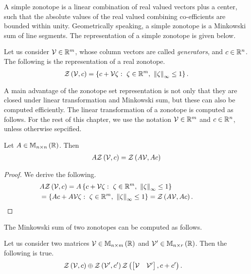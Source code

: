 A simple zonotope is a linear combination of real valued vectors plus a
center, such that the absolute values of the real valued combining
co-efficients are bounded within unity.  Geometrically speaking, a
simple zonotope is a Minkowski sum of line segments.  The
representation of a simple zonotope is given below.
%
\begin{definition}
Let us consider $\mathcal{V}\in\mathbb{R}^m$, whose column vectors are called
{\it generators}, and $c\in\mathbb{R}^n$.  The following is the
representation of a real zonotope.
%
\begin{align*}
\mathit{\mathcal{Z}}\left(\mathcal{V},c\right)=\left\{c+\mathcal{V}\zeta:~\zeta\in\mathbb{R}^m,~\left\|\zeta\right\|_{\infty}\leq 1\right\}.
\end{align*}
%
\end{definition}
%
A main advantage of the zonotope set representation is not only that
they are closed under linear transformation and Minkowski sum, but
these can also be computed efficiently.  The linear transformation of
a zonotope is computed as follows.  For the rest of this chapter, we
use the notation $\mathcal{V}\in\mathbb{R}^m$ and $c\in\mathbb{R}^n$, unless
otherwise sepcified.
%
\begin{lemma}
Let $A\in\mathbb{M}_{n\times n}\left(\mathbb{R}\right)$.  Then
%
\begin{align*}
A\mathit{\mathcal{Z}}\left(\mathcal{V},c\right)=\mathit{\mathcal{Z}}\left(A\mathcal{V},Ac\right)
\end{align*}
%
\end{lemma} 
%
\begin{proof}
We derive the following.
%
\begin{align*}
&
  A\mathit{\mathcal{Z}}\left(\mathcal{V},c\right)=A\left\{c+\mathcal{V}\zeta:~\zeta\in\mathbb{R}^m,~\left\|\zeta\right\|_{\infty}\leq
    1\right\}\\
& = \left\{Ac+A\mathcal{V}\zeta:~\zeta\in\mathbb{R}^m,~\left\|\zeta\right\|_{\infty}\leq 1\right\}=\mathit{\mathcal{Z}}\left(A\mathcal{V},Ac\right).\hspace{3em}\qedhere
\end{align*}
%
\end{proof}
%
The Minkowski sum of two zonotopes can be computed as follows.
%
\begin{lemma}
Let us consider two matrices $\mathcal{V}\in\mathbb{M}_{n\times m}\left(\mathbb{R}\right)$ and
$\mathcal{V}^\prime\in\mathbb{M}_{n\times r}\left(\mathbb{R}\right)$.  Then the following is true.
%
\begin{align*}
& \mathit{\mathcal{Z}}\left(\mathcal{V},c\right)\oplus\mathit{\mathcal{Z}}\left(\mathcal{V}^\prime,c^\prime\right)
 \mathit{\mathcal{Z}}\left(\left[\begin{matrix}\mathcal{V} & \mathcal{V}^\prime\end{matrix}\right],c+c^\prime\right).  
\end{align*}
%
\end{lemma}
%
